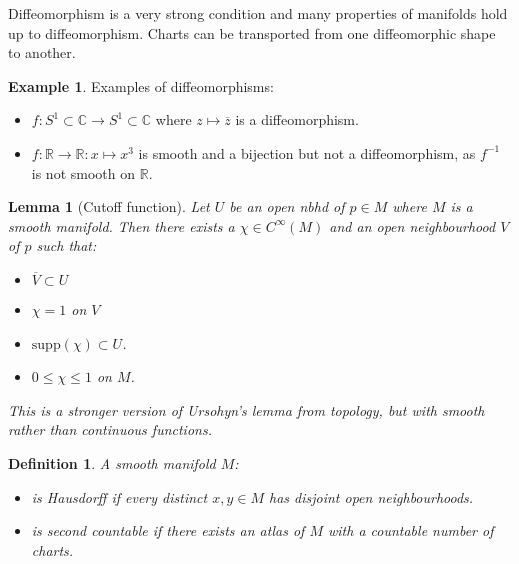\documentclass{article}
\newtheorem{lemma}[theorem]{Lemma}
\newtheorem{definition}[theorem]{Definition}
\theoremstyle{definition}
\newtheorem{example}[theorem]{Example}
\numberwithin{theorem}{section}
\numberwithin{equation}{section}
\begin{document}
Diffeomorphism is a very strong condition and many properties of manifolds hold up to diffeomorphism. Charts can be transported from one diffeomorphic shape to another. 

\begin{example}
	Examples of diffeomorphisms:
	\begin{itemize}
		\item $f: S^1 \subset \mathbb{C} \rightarrow S^1 \subset \mathbb{C}$ where $z \mapsto \overline{z}$ is a diffeomorphism.
		\item $f: \mathbb{R} \rightarrow \mathbb{R}: x \mapsto x^3$ is smooth and a bijection but not a diffeomorphism, as $f^{-1}$ is not smooth on $\mathbb{R}$. 
	\end{itemize}
\end{example}

\begin{lemma}[Cutoff function]
	Let $U$ be an open nbhd of $p \in M$ where $M$ is a smooth manifold. Then there exists a $\chi \in C^\infty(M)$ and an open neighbourhood $V$ of $p$ such that:
	\begin{itemize}
		\item $\overline{V} \subset U$
		\item $\chi = 1$ on $V$
		\item $\text{supp} (\chi) \subset U$.
		\item $0 \leq \chi \leq 1$ on $M$.
	\end{itemize}
	This is a stronger version of Ursohyn's lemma from topology, but with smooth rather than continuous functions.
\end{lemma}

\begin{definition}
	A smooth manifold $M$:
	\begin{itemize}
		\item is Hausdorff if every distinct $x, y \in M$ has disjoint open neighbourhoods.
		\item is second countable if there exists an atlas of $M$ with a countable number of charts.  
	\end{itemize}
\end{definition}
\end{document}
